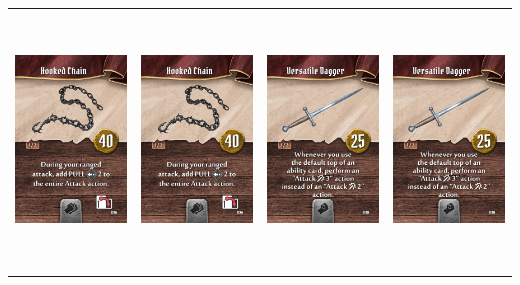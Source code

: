 \documentclass{minimal}
\begin{document}
{\begin{longtable}{llll}
\includegraphics[width=44mm,height=68mm]{./36-42/gh-039-hooked-chain.png} &
\includegraphics[width=44mm,height=68mm]{./36-42/gh-039-hooked-chain.png} &
\includegraphics[width=44mm,height=68mm]{./36-42/gh-040-versatile-dagger.png} &
\includegraphics[width=44mm,height=68mm]{./36-42/gh-040-versatile-dagger.png}\\ 

\end{longtable}}
\end{document}
